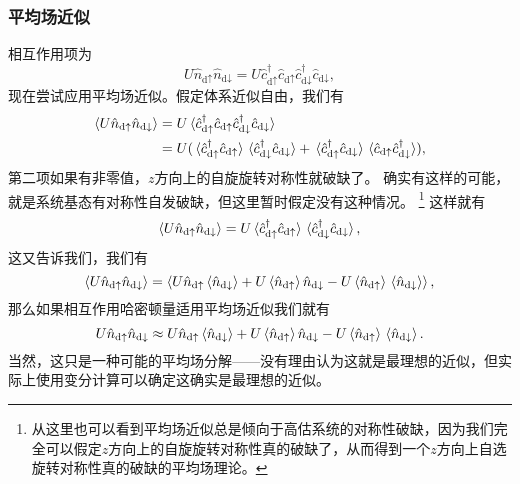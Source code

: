 \documentclass[hyperref, UTF8, a4paper]{ctexart}
\begin{document}
\subsubsection{平均场近似}

相互作用项为
\[
    U \hat{n}_{\text{d} \uparrow} \hat{n}_{\text{d} \downarrow} = U \hat{c}_{\text{d} \uparrow}^\dagger \hat{c}_{\text{d} \uparrow} \hat{c}^\dagger_{\text{d} \downarrow} \hat{c}_{\text{d} \downarrow},
\]
现在尝试应用平均场近似。假定体系近似自由，我们有
\[
    \begin{aligned}
        \expval{U \hat{n}_{\text{d} \uparrow} \hat{n}_{\text{d} \downarrow}} &= U \expval*{\hat{c}_{\text{d} \uparrow}^\dagger \hat{c}_{\text{d} \uparrow} \hat{c}^\dagger_{\text{d} \downarrow} \hat{c}_{\text{d} \downarrow}} \\
        &= U ( \expval*{\hat{c}_{\text{d} \uparrow}^\dagger \hat{c}_{\text{d} \uparrow}} \expval*{\hat{c}_{\text{d} \downarrow}^\dagger \hat{c}_{\text{d} \downarrow}} + \expval*{\hat{c}_{\text{d} \uparrow}^\dagger \hat{c}_{\text{d} \downarrow}} \expval*{\hat{c}_{\text{d} \uparrow} \hat{c}^\dagger_{\text{d} \downarrow}} ),
    \end{aligned}
\]
第二项如果有非零值，$z$方向上的自旋旋转对称性就破缺了。
确实有这样的可能，就是系统基态有对称性自发破缺，但这里暂时假定没有这种情况。%
\footnote{从这里也可以看到平均场近似总是倾向于高估系统的对称性破缺，因为我们完全可以假定$z$方向上的自旋旋转对称性真的破缺了，从而得到一个$z$方向上自选旋转对称性真的破缺的平均场理论。
}%
这样就有
\[
    \expval{U \hat{n}_{\text{d} \uparrow} \hat{n}_{\text{d} \downarrow}} = U \expval*{\hat{c}_{\text{d} \uparrow}^\dagger \hat{c}_{\text{d} \uparrow}} \expval*{\hat{c}_{\text{d} \downarrow}^\dagger \hat{c}_{\text{d} \downarrow}},
\]
这又告诉我们，我们有
\[
    \expval{U \hat{n}_{\text{d} \uparrow} \hat{n}_{\text{d} \downarrow}} = \expval{ U \hat{n}_{\text{d} \uparrow} \expval*{\hat{n}_{\text{d} \downarrow}} + U \expval*{\hat{n}_{\text{d} \uparrow}} \hat{n}_{\text{d} \downarrow} - U \expval*{\hat{n}_{\text{d} \uparrow}} \expval*{\hat{n}_{\text{d} \downarrow}} },
\]
那么如果相互作用哈密顿量适用平均场近似我们就有
\begin{equation}
    U \hat{n}_{\text{d} \uparrow} \hat{n}_{\text{d} \downarrow} \approx U \hat{n}_{\text{d} \uparrow} \expval*{\hat{n}_{\text{d} \downarrow}} + U \expval*{\hat{n}_{\text{d} \uparrow}} \hat{n}_{\text{d} \downarrow} - U \expval*{\hat{n}_{\text{d} \uparrow}} \expval*{\hat{n}_{\text{d} \downarrow}}.
\end{equation}
当然，这只是一种可能的平均场分解——没有理由认为这就是最理想的近似，但实际上使用变分计算可以确定这确实是最理想的近似。
\end{document}
